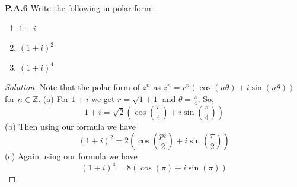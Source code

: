 \documentclass[12pt]{amsart}
\newenvironment{solution}
{\begin{proof}[Solution]}
{\end{proof}}
\begin{document}
\begin{onehalfspace}
        \noindent\textbf{P.A.6} Write the following in polar form:
        \begin{enumerate}[label=(\alph*)]
            \item $1 + i$
            \item $(1 + i)^2$
            \item $(1 + i)^4$
        \end{enumerate}
        \begin{solution}
            Note that the polar form of $z^n$ as $z^n = r^n(\cos(n\theta) + i\sin(n\theta))$ for $n\in\mathbb{Z}$.
            (a) For $1 + i$ we get $r = \sqrt{1 + 1}$ and $\theta = \frac{\pi}{4}$. So,
            \begin{displaymath}
                1+i = \sqrt{2}\left(\cos\left(\frac{\pi}{4}\right) + i\sin\left(\frac{\pi}{4}\right)\right)
            \end{displaymath}
            (b) Then using our formula we have
            \begin{displaymath}
                (1+i)^2 = 2\left(\cos\left(\frac{pi}{2}\right) + i\sin\left(\frac{\pi}{2}\right)\right)
            \end{displaymath}
            (c) Again using our formula we have
            \begin{displaymath}
                (1 + i)^4 = 8\left(\cos(\pi) + i\sin(\pi)\right)
            \end{displaymath}
        \end{solution}


\end{onehalfspace}
\end{document}
